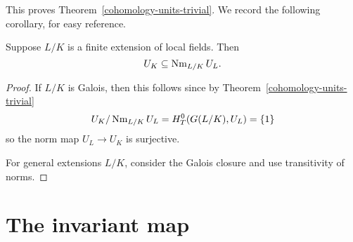 This proves Theorem~\ref{cohomology-units-trivial}. We record the following corollary, for easy reference.
\begin{cor}
Suppose $L/K$ is a finite extension of local fields. Then
\[
U_K\subseteq \operatorname{Nm}_{L/K}U_L.
\]
\end{cor}
\begin{proof}
If $L/K$ is Galois, then this follows since by Theorem~\ref{cohomology-units-trivial}
\[
U_K/\operatorname{Nm}_{L/K}U_L=H_T^0(G(L/K),U_L)=\{1\}
\]
so the norm map $U_L\to U_K$ is surjective.

For general extensions $L/K$, consider the Galois closure and use transitivity of norms.
\end{proof}
\section{The invariant map}
